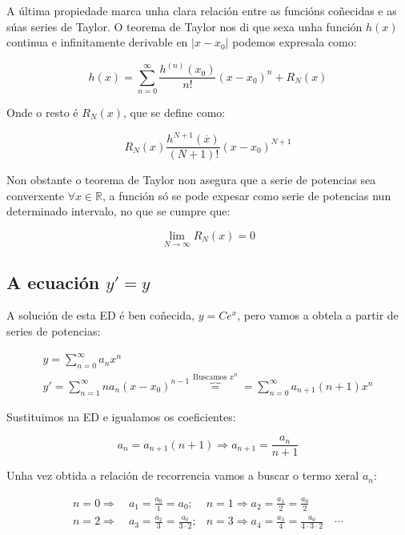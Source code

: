 \documentclass[a4paper,12pt,titlepage]{article}
\begin{document}
A última propiedade marca unha clara relación entre as funcións coñecidas e as súas series de Taylor. O teorema de Taylor nos di que sexa unha función $h(x)$continua e infinitamente derivable en $|x-x_0|$ podemos expresala como:

\begin{equation*}
    h(x) = \sum_{n=0}^{\infty} \frac{h^{(n)}(x_0)}{n!} (x-x_0)^n + R_N(x)
\end{equation*}

Onde o resto é $R_N(x)$, que se define como:

\begin{equation*}
    R_N(x) \frac{h^{N+1}(\overline{x})}{(N+1)!}(x-x_0)^{N+1}
\end{equation*}

Non obstante o teorema de Taylor non asegura que a serie de potencias sea converxente $\forall x \in \mathbb{R}$, a función só se pode expesar como serie de potencias nun determinado intervalo, no que se cumpre que:

\begin{equation*}
    \lim_{N\to \infty}R_N(x)=0
\end{equation*}

\subsection{A ecuación $y'=y$}

A solución de esta ED é ben coñecida, $y=Ce^x$, pero vamos a obtela a partir de series de potencias:

\begin{equation*}
    \begin{gathered}
        y = \sum_{n=0}^{\infty} a_nx^n \\
        y' = \sum_{n=1}^{\infty} na_n(x-x_0)^{n-1} \overbrace{=}^{\text{Buscamos $x^n$}} = \sum_{n=0}^{\infty} a_{n+1}(n+1)x^{n}
    \end{gathered}
\end{equation*}

Sustituimos na ED e igualamos os coeficientes:

\begin{equation*}
    a_n= a_{n+1}(n+1) \Rightarrow a_{n+1}=\frac{a_n}{n+1}
\end{equation*}

Unha vez obtida a relación de recorrencia vamos a buscar o termo xeral $a_n$:

\begin{equation*}
    \begin{array}{ll}
    n=0 \Rightarrow \quad a_1=\frac{a_0}{1}=a_0 ; & n=1 \Rightarrow a_2=\frac{a_1}{2}=\frac{a_0}{2} \\
    n=2 \Rightarrow \quad a_3=\frac{a_2}{3}=\frac{a_0}{3 \cdot 2} ; & n=3 \Rightarrow a_4=\frac{a_3}{4}=\frac{a_0}{4 \cdot 3 \cdot 2} \quad \cdots
    \end{array}
\end{equation*}
\end{document}
